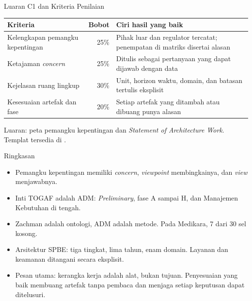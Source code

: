 \documentclass[aspectratio=169, table, 12pt]{beamer}
\begin{document}
\begin{frame}{{\Large Luaran C1 dan Kriteria Penilaian}}
  \footnotesize
  \begin{tabularx}{\textwidth}{>{\raggedright\arraybackslash}p{5.0cm} r
      >{\raggedright\arraybackslash}X}
    \hline
    \textbf{Kriteria} & \textbf{Bobot} & \textbf{Ciri hasil yang baik} \\
    \hline
    Kelengkapan pemangku kepentingan & 25\% & Pihak luar dan regulator tercatat; penempatan di matriks disertai alasan \\
    \hline
    Ketajaman \textit{concern} & 25\% & Ditulis sebagai pertanyaan yang dapat dijawab dengan data \\
    \hline
    Kejelasan ruang lingkup & 30\% & Unit, horizon waktu, domain, dan batasan tertulis eksplisit \\
    \hline
    Kesesuaian artefak dan fase & 20\% & Setiap artefak yang ditambah atau dibuang punya alasan \\
    \hline
  \end{tabularx}

  \vspace{8pt}
  \small Luaran: peta pemangku kepentingan dan \textit{Statement of Architecture Work}. Templat tersedia
  di .
\end{frame}

\begin{frame}{{\Large Ringkasan}}
  \vspace{6pt}
  \small
  \begin{itemize}
    \item Pemangku kepentingan memiliki \textit{concern}, \textit{viewpoint} membingkainya, dan
          \textit{view} menjawabnya.
    \item Inti TOGAF adalah ADM: \textit{Preliminary}, fase A sampai H, dan Manajemen Kebutuhan di
          tengah.
    \item Zachman adalah ontologi, ADM adalah metode. Pada Medikara, 7 dari 30 sel kosong.
    \item Arsitektur SPBE: tiga tingkat, lima tahun, enam domain. Layanan dan keamanan ditangani secara
          eksplisit.
    \item Pesan utama: kerangka kerja adalah alat, bukan tujuan. Penyesuaian yang baik membuang artefak
          tanpa pembaca dan menjaga setiap keputusan dapat ditelusuri.
  \end{itemize}
\end{frame}
\end{document}
